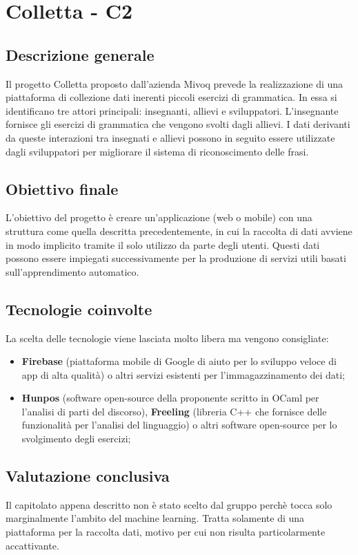 \section{Colletta - C2} \label{c2}
    \subsection{Descrizione generale}
    Il progetto Colletta proposto dall'azienda Mivoq prevede la realizzazione di una piattaforma di collezione dati inerenti piccoli esercizi di grammatica. In essa si identificano tre attori principali: insegnanti, allievi e sviluppatori. L'insegnante fornisce gli esercizi di grammatica che vengono svolti dagli allievi. I dati derivanti da queste interazioni tra insegnati e allievi possono in seguito essere utilizzate dagli sviluppatori per migliorare il sistema di riconoscimento delle frasi.

    \subsection{Obiettivo finale}
    L'obiettivo del progetto è creare un'applicazione (web o mobile) con una struttura come quella descritta precedentemente, in cui la raccolta di dati avviene in modo implicito tramite il solo utilizzo da parte degli utenti. Questi dati possono essere impiegati successivamente per la produzione di servizi utili basati sull'apprendimento automatico.

    \subsection{Tecnologie coinvolte}
    La scelta delle tecnologie viene lasciata molto libera ma vengono consigliate:
    	\begin{itemize}
    		\item \textbf{Firebase} (piattaforma mobile di Google di aiuto per lo sviluppo veloce di app di alta qualità) o altri servizi esistenti per l'immagazzinamento dei dati;
    		\item \textbf{Hunpos} (software open-source della proponente scritto in OCaml per l'analisi di parti del discorso), \textbf{Freeling} (libreria C++ che fornisce delle funzionalità per l'analisi del linguaggio) o altri software open-source per lo svolgimento degli esercizi;
    	\end{itemize}

    \subsection{Valutazione conclusiva}
    Il capitolato appena descritto non è stato scelto dal gruppo perchè tocca solo marginalmente l'ambito del machine learning. Tratta solamente di una piattaforma per la raccolta dati, motivo per cui non risulta particolarmente accattivante.
